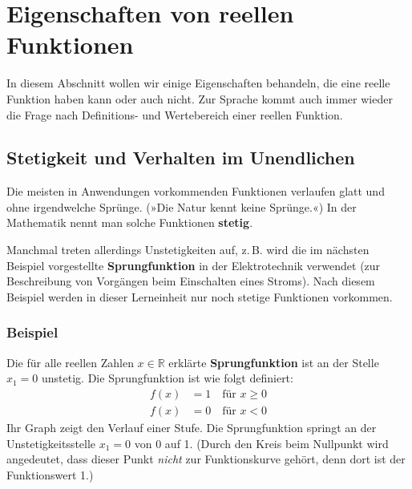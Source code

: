 \section{Eigenschaften von reellen Funktionen}

In diesem Abschnitt wollen wir einige Eigenschaften behandeln, die eine reelle Funktion haben kann oder auch nicht. Zur Sprache kommt auch immer wieder die Frage nach Definitions- und Wertebereich einer reellen Funktion.

\subsection{Stetigkeit und Verhalten im Unendlichen}

Die meisten in Anwendungen vorkommenden Funktionen verlaufen glatt und ohne irgendwelche Sprünge. (»Die Natur kennt keine Sprünge.«) In der Mathematik nennt man solche Funktionen \textbf{stetig}.

Manchmal treten allerdings Unstetigkeiten auf, z.\,B. wird die im nächsten Beispiel vorgestellte \textbf{Sprungfunktion} in der Elektrotechnik verwendet (zur Beschreibung von Vorgängen beim Einschalten eines Stroms). Nach diesem Beispiel werden in dieser Lerneinheit nur noch stetige Funktionen vorkommen.

\subsubsection{Beispiel}

Die für alle reellen Zahlen $x \in \mathbb{R}$ erklärte \textbf{Sprungfunktion} ist an der Stelle $x_1 = 0$ unstetig. Die Sprungfunktion ist wie folgt definiert:
\begin{align*}
  f(x) &= 1 \quad \text{für } x \geq 0\\
  f(x) &= 0 \quad \text{für } x < 0
\end{align*}
Ihr Graph zeigt den Verlauf einer Stufe. Die Sprungfunktion springt an der Unstetigkeitsstelle $x_1 = 0$ von 0 auf 1. (Durch den Kreis beim Nullpunkt wird angedeutet, dass dieser Punkt \emph{nicht} zur Funktionskurve gehört, denn dort ist der Funktionswert 1.)

\begin{center}
\end{center}

